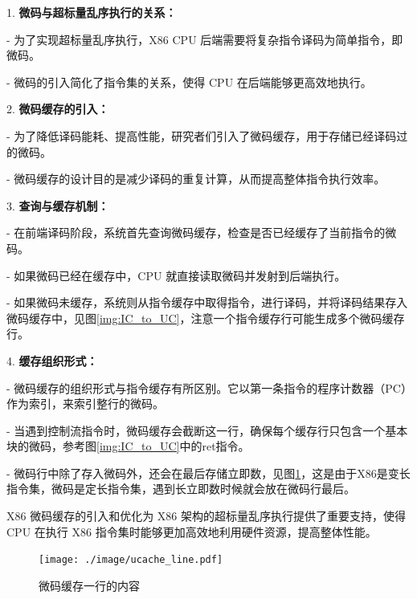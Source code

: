 1. \textbf{微码与超标量乱序执行的关系：}

   - 为了实现超标量乱序执行，X86 CPU 后端需要将复杂指令译码为简单指令，即微码。

   - 微码的引入简化了指令集的关系，使得 CPU 在后端能够更高效地执行。

2. \textbf{微码缓存的引入：}

- 为了降低译码能耗、提高性能，研究者们引入了微码缓存，用于存储已经译码过的微码。

- 微码缓存的设计目的是减少译码的重复计算，从而提高整体指令执行效率。

3. \textbf{查询与缓存机制：}
  
- 在前端译码阶段，系统首先查询微码缓存，检查是否已经缓存了当前指令的微码。

- 如果微码已经在缓存中，CPU 就直接读取微码并发射到后端执行。

- 如果微码未缓存，系统则从指令缓存中取得指令，进行译码，并将译码结果存入微码缓存中，见图\ref{img:IC_to_UC}，注意一个指令缓存行可能生成多个微码缓存行。

4. \textbf{缓存组织形式：}

- 微码缓存的组织形式与指令缓存有所区别。它以第一条指令的程序计数器（PC）作为索引，来索引整行的微码。

- 当遇到控制流指令时，微码缓存会截断这一行，确保每个缓存行只包含一个基本块的微码，参考图\ref{img:IC_to_UC}中的ret指令。

- 微码行中除了存入微码外，还会在最后存储立即数，见图\ref{img:ucache_line}，这是由于X86是变长指令集，微码是定长指令集，遇到长立即数时候就会放在微码行最后。

X86 微码缓存的引入和优化为 X86 架构的超标量乱序执行提供了重要支持，使得 CPU 在执行 X86 指令集时能够更加高效地利用硬件资源，提高整体性能。

\begin{figure}[h]
  \centering
  \texttt{[image: ./image/ucache\_line.pdf]}
  \caption{微码缓存一行的内容}
  \label{img:ucache_line}
\end{figure}
